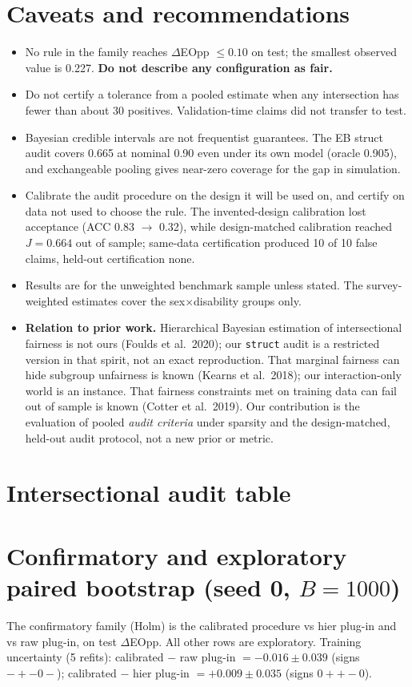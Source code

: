 \documentclass[10pt]{article}
\begin{document}
\section{Caveats and recommendations}\label{sec:caveats}
\begin{itemize}
  \item No rule in the family reaches $\Delta$EOpp $\le0.10$ on test; the smallest observed value is 0.227.
    \textbf{Do not describe any configuration as fair.}
  \item Do not certify a tolerance from a pooled estimate when any intersection has fewer than about 30 positives.
    Validation-time claims did not transfer to test.
  \item Bayesian credible intervals are not frequentist guarantees. The EB struct audit covers 0.665 at nominal 0.90 even
    under its own model (oracle 0.905), and exchangeable pooling gives near-zero coverage for the gap in simulation.
  \item Calibrate the audit procedure on the design it will be used on, and certify on data not used to choose the rule.
    The invented-design calibration lost acceptance (ACC 0.83 $\to$ 0.32), while design-matched calibration reached
    $J=0.664$ out of sample; same-data certification produced 10 of 10 false claims, held-out certification none.
  \item Results are for the unweighted benchmark sample unless stated. The survey-weighted estimates cover the
    sex$\times$disability groups only.
  \item \textbf{Relation to prior work.} Hierarchical Bayesian estimation of intersectional fairness is not ours (Foulds et al.\ 2020); our \texttt{struct} audit is a restricted version in that spirit, not an exact reproduction. That marginal fairness can hide subgroup unfairness is known (Kearns et al.\ 2018); our interaction-only world is an instance. That fairness constraints met on training data can fail out of sample is known (Cotter et al.\ 2019). Our contribution is the evaluation of pooled \emph{audit criteria} under sparsity and the design-matched, held-out audit protocol, not a new prior or metric.
\end{itemize}

\clearpage
\begin{landscape}
\appendix
\section{Intersectional audit table}
{\small\setlength{\tabcolsep}{4pt}}
\section{Confirmatory and exploratory paired bootstrap (seed 0, $B=1000$)}\label{tab:conf}
{\small}

\medskip\noindent The confirmatory family (Holm) is the calibrated procedure vs hier plug-in and vs raw plug-in, on test
$\Delta$EOpp. All other rows are exploratory. Training uncertainty (5 refits): calibrated $-$ raw plug-in
$=-0.016\pm0.039$ (signs $-+-0-$); calibrated $-$ hier plug-in $=+0.009\pm0.035$ (signs $0++-0$).
\end{landscape}
\end{document}
